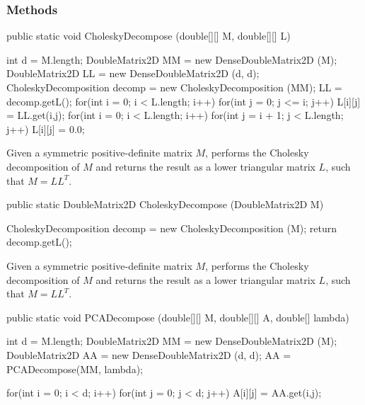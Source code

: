 \subsubsection* {Methods}
\begin{code}

   public static void CholeskyDecompose (double[][] M, double[][] L) \begin{hide} {
      int d = M.length;
      DoubleMatrix2D MM = new DenseDoubleMatrix2D (M);
      DoubleMatrix2D LL = new DenseDoubleMatrix2D (d, d);
      CholeskyDecomposition decomp = new CholeskyDecomposition (MM);
      LL = decomp.getL();
      for(int i = 0; i < L.length; i++)
         for(int j = 0; j <= i; j++)
            L[i][j] = LL.get(i,j);
      for(int i = 0; i < L.length; i++)
         for(int j = i + 1; j < L.length; j++)
            L[i][j] = 0.0;
    } \end{hide}
\end{code}
\begin{tabb} Given a symmetric positive-definite matrix $M$, performs the
Cholesky decomposition of $M$ and returns the result as a lower triangular
matrix $L$, such that $M = L L^T$.
\end{tabb}
\begin{htmlonly}
\end{htmlonly}
\begin{code}

   public static DoubleMatrix2D CholeskyDecompose (DoubleMatrix2D M) \begin{hide} {
      CholeskyDecomposition decomp = new CholeskyDecomposition (M);
      return decomp.getL();
    } \end{hide}
\end{code}
\begin{tabb} Given a symmetric positive-definite matrix $M$, performs the
Cholesky decomposition of $M$ and returns the result as a lower triangular
matrix $L$, such that $M = L L^T$.
\end{tabb}
\begin{htmlonly}
\end{htmlonly}
\begin{code}

   public static void PCADecompose (double[][] M, double[][] A,
                                    double[] lambda)\begin{hide} {
      int d = M.length;
      DoubleMatrix2D MM = new DenseDoubleMatrix2D (M);
      DoubleMatrix2D AA = new DenseDoubleMatrix2D (d, d);
      AA = PCADecompose(MM, lambda);

      for(int i = 0; i < d; i++)
         for(int j = 0; j < d; j++)
            A[i][j] = AA.get(i,j);
    } \end{hide}
\end{code}
